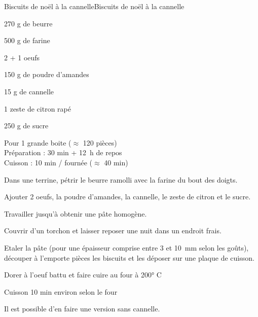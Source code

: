 \begin{recette}{Biscuits de noël à la cannelle}{Biscuits de noël à la cannelle}

\begin{ingredients}
270 g de beurre\par
500 g de farine\par
2 + 1 oeufs\par
150 g de poudre d'amandes\par
15 g de cannelle\par
1 zeste de citron rapé\par
250 g de sucre\par
\end{ingredients}

\begin{infos}
Pour 1 grande boite ($\approx$ 120 pièces)\\
Préparation : 30 min + 12~h de repos\\
Cuisson : 10 min / fournée  ($\approx$ 40 min)\\
\end{infos}

\begin{etapes}
\item Dans une terrine, pétrir le beurre ramolli avec la farine du bout des doigts.
\item Ajouter 2 oeufs, la poudre d'amandes, la cannelle, le zeste de citron et le sucre.
\item Travailler jusqu'à obtenir une pâte homogène.
\item Couvrir d'un torchon et laisser reposer une nuit dans un endroit frais.
\item Etaler la pâte (pour une épaisseur comprise entre 3 et 10~mm selon les goûts), découper à l'emporte pièces les biscuits et les déposer sur une plaque de cuisson.
\item Dorer à l'oeuf battu et faire cuire au four à 200° C
\item Cuisson 10 min environ selon le four
\end{etapes}

\begin{conseils}
Il est possible d'en faire une version sans cannelle.
\end{conseils}

\end{recette}